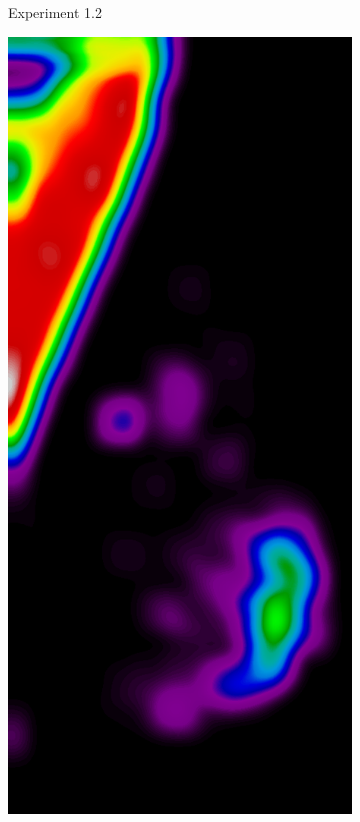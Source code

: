 \begin{figure}[h!]
\begin{subfigure}{0.195\textwidth}
		\caption{Experiment 1.2}
    \end{subfigure}
	\begin{subfigure}{0.195\textwidth}
		\centering
			\includegraphics[width=\textwidth]{plots/examples/example4_probs_1_3.png}

\end{subfigure}
\end{figure}
